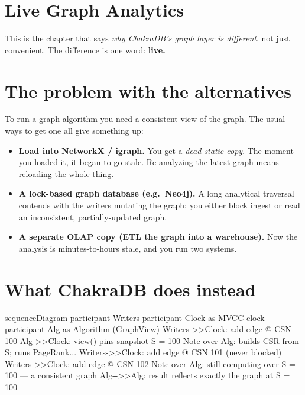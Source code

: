\documentclass[
  11pt,
  openany]{book}
\newenvironment{Shaded}{}{}
\newcommand{\NormalTok}[1]{#1}
\providecommand{\tightlist}{%
  \setlength{\itemsep}{0pt}\setlength{\parskip}{0pt}}
\begin{document}
\section{Live Graph Analytics}\label{live-graph-analytics}

This is the chapter that says \emph{why ChakraDB's graph layer is
different}, not just convenient. The difference is one word:
\textbf{live.}

\section{The problem with the
alternatives}\label{the-problem-with-the-alternatives}

To run a graph algorithm you need a consistent view of the graph. The
usual ways to get one all give something up:

\begin{itemize}
\tightlist
\item
  \textbf{Load into NetworkX / igraph.} You get a \emph{dead static
  copy}. The moment you loaded it, it began to go stale. Re-analyzing
  the latest graph means reloading the whole thing.
\item
  \textbf{A lock-based graph database (e.g.~Neo4j).} A long analytical
  traversal contends with the writers mutating the graph; you either
  block ingest or read an inconsistent, partially-updated graph.
\item
  \textbf{A separate OLAP copy (ETL the graph into a warehouse).} Now
  the analysis is minutes-to-hours stale, and you run two systems.
\end{itemize}

\section{What ChakraDB does instead}\label{what-chakradb-does-instead}

\begin{Shaded}
\begin{Highlighting}[]
\NormalTok{sequenceDiagram}
\NormalTok{    participant Writers}
\NormalTok{    participant Clock as MVCC clock}
\NormalTok{    participant Alg as Algorithm (GraphView)}
\NormalTok{    Writers{-}\textgreater{}\textgreater{}Clock: add edge @ CSN 100}
\NormalTok{    Alg{-}\textgreater{}\textgreater{}Clock: view() pins snapshot S = 100}
\NormalTok{    Note over Alg: builds CSR from S; runs PageRank...}
\NormalTok{    Writers{-}\textgreater{}\textgreater{}Clock: add edge @ CSN 101  (never blocked)}
\NormalTok{    Writers{-}\textgreater{}\textgreater{}Clock: add edge @ CSN 102}
\NormalTok{    Note over Alg: still computing over S = 100 — a consistent graph}
\NormalTok{    Alg{-}{-}\textgreater{}\textgreater{}Alg: result reflects exactly the graph at S = 100}
\end{Highlighting}
\end{Shaded}
\end{document}
